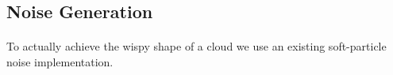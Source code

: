 \newpage
\subsection{Noise Generation}\paragraph{}
To actually achieve the wispy shape of a cloud we use an existing soft-particle noise implementation. 
